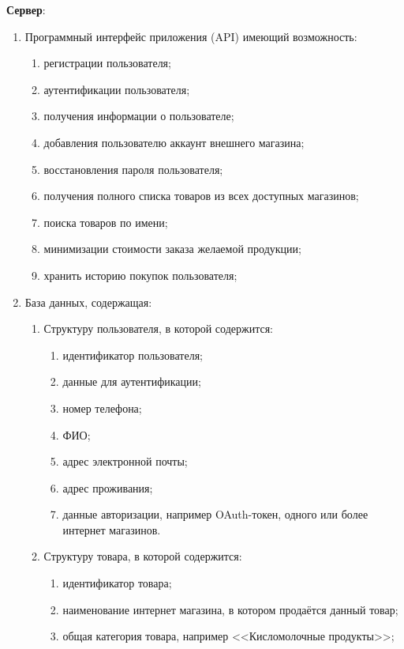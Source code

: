 \documentclass[a4paper,12pt]{article}
\begin{document}
  \noindent\textbf{Сервер}:
  \begin{enumerate}
    \item Программный интерфейс приложения (API) имеющий возможность:
    \begin{enumerate}
      \item регистрации пользователя;
      \item аутентификации пользователя; %
      \item получения информации о пользователе;
      \item добавления пользователю аккаунт внешнего магазина; %
      \item восстановления пароля пользователя;
      \item получения полного списка товаров из всех доступных магазинов;
      \item поиска товаров по имени;
      \item минимизации стоимости заказа желаемой продукции;
      \item хранить историю покупок пользователя;
    \end{enumerate}
    \item База данных, содержащая:
    \begin{enumerate}
      \item Структуру пользователя, в которой содержится:
      \begin{enumerate}
        \item идентификатор пользователя;
        \item данные для аутентификации;
        \item номер телефона;
        \item ФИО;
        \item адрес электронной почты;
        \item адрес проживания; %
        \item данные авторизации, например OAuth-токен, одного или более интернет магазинов.
      \end{enumerate}
      \item Структуру товара, в которой содержится:
      \begin{enumerate}
        \item идентификатор товара;
        \item наименование интернет магазина, в котором продаётся данный товар;
        \item общая категория товара, например <<Кисломолочные продукты>>;

\end{enumerate}
\end{enumerate}
\end{enumerate}
\end{document}
